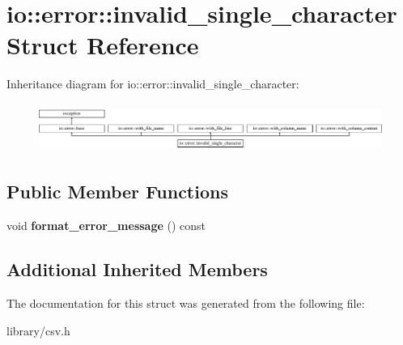 \hypertarget{structio_1_1error_1_1invalid__single__character}{}\section{io\+:\+:error\+:\+:invalid\+\_\+single\+\_\+character Struct Reference}
\label{structio_1_1error_1_1invalid__single__character}
Inheritance diagram for io\+:\+:error\+:\+:invalid\+\_\+single\+\_\+character\+:\begin{figure}[H]
\begin{center}
\leavevmode
\includegraphics[height=1.600000cm]{structio_1_1error_1_1invalid__single__character}
\end{center}
\end{figure}
\subsection*{Public Member Functions}
\begin{DoxyCompactItemize}
\item 
\mbox{\label{structio_1_1error_1_1invalid__single__character_a074ab35a8013ad15041a9bb9188e69bf}} 
void {\bfseries format\+\_\+error\+\_\+message} () const
\end{DoxyCompactItemize}
\subsection*{Additional Inherited Members}


The documentation for this struct was generated from the following file\+:\begin{DoxyCompactItemize}
\item 
library/csv.\+h\end{DoxyCompactItemize}
